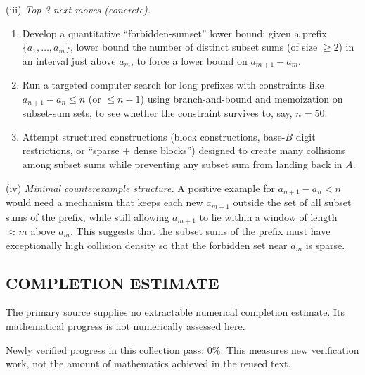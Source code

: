 \noindent(iii) \emph{Top 3 next moves (concrete).}
\begin{enumerate}
\item Develop a quantitative ``forbidden-sumset'' lower bound: given a prefix $\{a_1,\dots,a_m\}$, lower bound the number of distinct subset sums (of size $\ge 2$) in an interval just above $a_m$, to force a lower bound on $a_{m+1}-a_m$.
\item Run a targeted computer search for long prefixes with constraints like $a_{n+1}-a_n\le n$ (or $\le n-1$) using branch-and-bound and memoization on subset-sum sets, to see whether the constraint survives to, say, $n=50$.
\item Attempt structured constructions (block constructions, base-$B$ digit restrictions, or ``sparse + dense blocks'') designed to create many collisions among subset sums while preventing any subset sum from landing back in $A$.
\end{enumerate}

\noindent(iv) \emph{Minimal counterexample structure.}
A positive example for $a_{n+1}-a_n<n$ would need a mechanism that keeps each new $a_{m+1}$ outside the set of all subset sums of the prefix, while still allowing $a_{m+1}$ to lie within a window of length $\approx m$ above $a_m$. This suggests that the subset sums of the prefix must have exceptionally high collision density so that the forbidden set near $a_m$ is sparse.




\subsection*{COMPLETION ESTIMATE}
The primary source supplies no extractable numerical completion estimate. Its mathematical progress is not numerically assessed here.

Newly verified progress in this collection pass: $0\%$. This measures new verification work, not the amount of mathematics achieved in the reused text.
